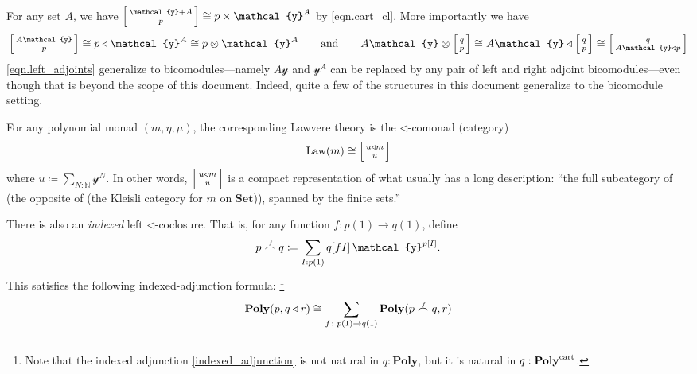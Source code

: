 \documentclass[11pt, one side, article]{memoir}
\makeatletter
\theoremstyle{definition}
\theoremstyle{plain}
\newcommand{\Cat}[1]{\mathbf{#1}}%
\newcommand{\tn}[1]{\textnormal{#1}}
\newcommand{\nn}{\mathbb{N}}
\newcommand{\smset}{\Cat{Set}}
\newcommand{\yon}{\mathcal{y}}
\newcommand{\poly}{\Cat{Poly}}
\newcommand{\polycart}{\poly^{\tn{cart}}}
\newcommand{\0}{\textsf{0}}
\newcommand{\1}{\tn{\textsf{1}}}
\newcommand{\tri}{\mathbin{\triangleleft}}
\newcommand{\biglens}[2]{
     \begin{bmatrix}{\vphantom{f_f^f}#2} \\ {\vphantom{f_f^f}#1} \end{bmatrix}
}
\newcommand{\littlelens}[2]{
     \begin{bsmallmatrix}{\vphantom{f}#2} \\ {\vphantom{f}#1} \end{bsmallmatrix}
}
\newcommand{\lens}[2]{
  \relax\if@display
     \biglens{#1}{#2}
  \else
     \littlelens{#1}{#2}
  \fi
}
\newcommand{\indexcoclscale}[1]{\scalebox{.7}{#1}}
\newcommand{\cocl}[1]{
	\scriptsize\overset{\,\indexcoclscale{$#1$}}{\frown}\normalsize
}
\newcommand{\qqand}{\qquad\text{and}\qquad}
\makeatother
\begin{document}
For any set $A$, we have $\lens{p}{\yon+A}\cong p\times\yon^A$ by \eqref{eqn.cart_cl}. More importantly we have
\begin{equation}\label{eqn.left_adjoints}
  \lens{p}{A\yon}\cong 
  p\tri\yon^A\cong 
  p\otimes\yon^A
  \qqand
  A\yon\otimes\lens{p}{q}\cong
  A\yon\tri\lens{p}{q}\cong
	\lens{A\yon\tri p}{q}
\end{equation}
\cref{eqn.left_adjoints} generalize to bicomodules---namely $A\yon$ and $\yon^A$ can be replaced by any pair of left and right adjoint bicomodules---even though that is beyond the scope of this document. Indeed, quite a few of the structures in this document generalize to the bicomodule setting.

For any polynomial monad $(m,\eta,\mu)$, the corresponding Lawvere theory is the $\tri$-comonad (category)
\begin{equation}
	\text{Law}(m)\cong\lens{u}{u\tri m}
\end{equation}
where $u\coloneqq\sum_{N:\nn}\yon^N$. In other words, $\lens{u}{u\tri m}$ is a compact representation of what usually has a long description: ``the full subcategory of (the opposite of (the Kleisli category for $m$ on $\smset$)), spanned by the finite sets.''

There is also an \emph{indexed} left $\tri$-coclosure. That is, for any function $f\colon p(1)\to q(1)$, define
\begin{equation}
	p\cocl{f}q\coloneqq \sum_{I: p(1)}q[fI]\,\yon^{p[I]}.
\end{equation}
This satisfies the following indexed-adjunction formula:%
\footnote{Note that the indexed adjunction \eqref{indexed_adjunction} is not natural in $q:\poly$, but it is natural in $q:\polycart$.}
\begin{equation}\label{indexed_adjunction}
	\poly(p,q\tri r)\cong\sum_{f\colon p(1)\to q(1)}\poly(p\cocl{f}q,r)
\end{equation}
\end{document}
